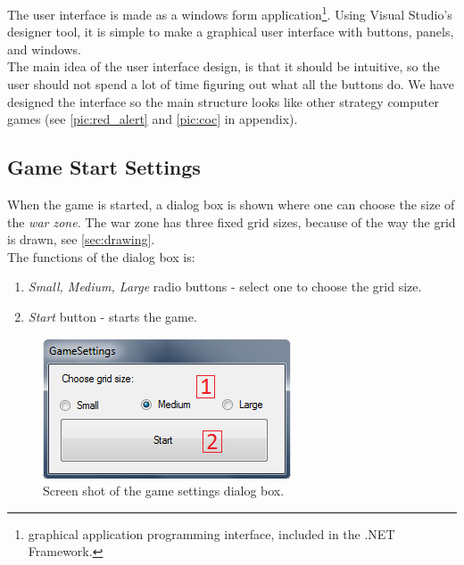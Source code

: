 The user interface is made as a windows form application\footnote{graphical application programming interface, included in the .NET Framework.}. Using Visual Studio's designer tool, it is simple to make a graphical user interface with buttons, panels, and windows.\\
   The main idea of the user interface design, is that it should be intuitive, so the user should not spend a lot of time figuring out what all the buttons do. We have designed the interface so the main structure looks like other strategy computer games (see \ref{pic:red_alert} and \ref{pic:coc} in appendix).
	
\subsection*{Game Start Settings}
When the game is started, a dialog box is shown where one can choose the size of the \textit{war zone}. The war zone has three fixed grid sizes, because of the way the grid is drawn, see \ref{sec:drawing}.\\
   The functions of the dialog box is:
\begin{enumerate}
	\item \textit{Small, Medium, Large} radio buttons - select one to choose the grid size.
	\item \textit{Start} button - starts the game.
\end{enumerate}

\begin{figure}[H]
\begin{center}
\includegraphics[scale=0.9]{Images/dialog.png}
\end{center}
\caption{Screen shot of the game settings dialog box.}
\label{dialog}
\end{figure}

